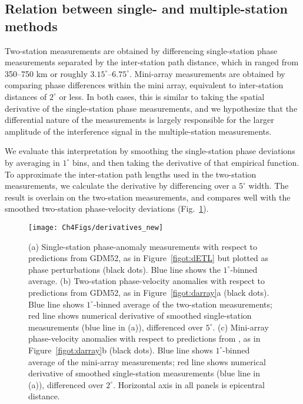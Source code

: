 \documentclass[12pt,oneside]{book}
\newcommand{\degree}[1]{\mbox{$#1^{\circ}$}}
\begin{document}
\subsection{Relation between single- and multiple-station methods}
Two-station measurements are obtained by differencing single-station phase measurements separated by the inter-station path distance, which in \citet{Fosteretal2014} ranged from 350--750 km or roughly \degree{3.15}--\degree{6.75}. Mini-array measurements are obtained by comparing phase differences within the mini array, equivalent to inter-station distances of \degree{2} or less. In both cases, this is similar to taking the spatial derivative of the single-station phase measurements, and we hypothesize that the differential nature of the measurements is largely responsible for the larger amplitude of the interference signal in the multiple-station measurements. 

We evaluate this interpretation by smoothing the single-station phase deviations by averaging in \degree{1} bins, and then taking the derivative of that empirical function. To approximate the inter-station path lengths used in the two-station measurements, we calculate the derivative by differencing over a \degree{5} width. The result is overlain on the two-station measurements, and compares well with the smoothed two-station phase-velocity deviations (Fig.~\ref{figot:derivatives}). 

\begin{figure} 
\begin{center}
\texttt{[image: Ch4Figs/derivatives\_new]} 
\caption[Single-station phase anomalies and array-measurement phase-velocity anomalies related by the spatial derivative]{(a) Single-station phase-anomaly measurements with respect to predictions from GDM52, as in Figure~\ref{figot:dETL} but plotted as phase perturbations (black dots). Blue line shows the \degree{1}-binned average. (b) Two-station phase-velocity anomalies with respect to predictions from GDM52, as in Figure~\ref{figot:darray}a (black dots). Blue line shows \degree{1}-binned average of the two-station measurements; red line shows numerical derivative of smoothed single-station measurements (blue line in (a)), differenced over \degree{5}. (c) Mini-array phase-velocity anomalies with respect to predictions from \citet{Fosteretal2014}, as in Figure~\ref{figot:darray}b (black dots). Blue line shows \degree{1}-binned average of the mini-array measurements; red line shows numerical derivative of smoothed single-station measurements (blue line in (a)), differenced over \degree{2}. Horizontal axis in all panels is epicentral distance. }
\label{figot:derivatives}
\end{center}
\end{figure}
%
\end{document}
